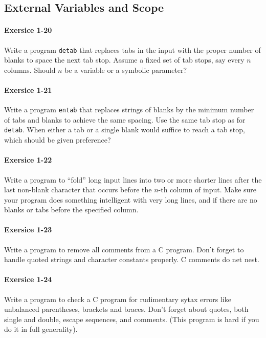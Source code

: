 	\newpage
	\subsection{External Variables and Scope}
		\paragraph{Exersice 1-20}
			Write a program \lstinline{detab} that replaces tabs in the input
			with the proper number of blanks to space the next tab stop.
			Assume a fixed set of tab stops, say every $n$ columns. Should $n$
			be a variable or a symbolic parameter?
	
			\hfill{}\cite[p.~34]{knr}

		\paragraph{Exersice 1-21}
			Write a program \lstinline{entab} that replaces strings of blanks
			by the minimum number of tabs and blanks to achieve the same
			spacing. Use the same tab stop as for \lstinline{detab}. When
			either a tab or a single blank would suffice to reach a tab stop,
			which should be given preference?
	
			\hfill{}\cite[p.~34]{knr}

		\paragraph{Exersice 1-22}
			Write a program to ``fold'' long input lines into two or more
			shorter lines after the last non-blank character that occurs
			before the $n$-th column of input. Make sure your program does
			something intelligent with very long lines, and if there are no
			blanks or tabs before the specified column.
	
			\hfill{}\cite[p.~34]{knr}

		\paragraph{Exersice 1-23}
			Write a program to remove all comments from a C program. Don't
			forget to handle quoted strings and character constants properly.
			C comments do net nest.
	
			\hfill{}\cite[p.~34]{knr}

		\paragraph{Exersice 1-24}
			Write a program to check a C program for rudimentary sytax
			errors like unbalanced parentheses, brackets and braces. Don't
			forget about quotes, both single and double, escape sequences,
			and comments. (This program is hard if you do it in full
			generality).
	
			\hfill{}\cite[p.~34]{knr}

